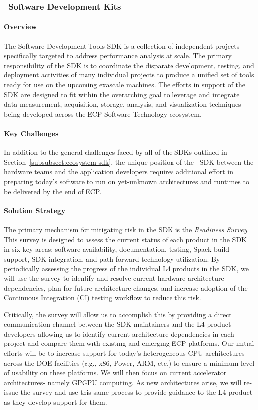 \subsubsection{ \tools\ Software Development Kits} 

\paragraph{Overview}
The Software Development Tools SDK is a collection of independent projects specifically targeted to address performance analysis at scale. The primary responsibility of the SDK is to coordinate the disparate development, testing, and deployment activities of many individual projects to produce a unified set of tools ready for use on the upcoming exascale machines. The efforts in support of the SDK are designed to fit within the overarching goal to leverage and integrate data measurement, acquisition, storage, analysis, and visualization techniques being developed across the ECP Software Technology ecosystem.


\paragraph{Key Challenges}
In addition to the general challenges faced by all of the SDKs outlined in Section~\ref{subsubsect:ecosystem-sdk}, the unique position of the \tools\ SDK between the hardware teams and the application developers requires additional effort in preparing today’s software to run on yet-unknown architectures and runtimes to be delivered by the end of ECP.

\paragraph{Solution Strategy}
The primary mechanism for mitigating risk in the SDK is the \textit{Readiness Survey}. This survey is designed to assess the current status of each product in the SDK in six key areas: software availability, documentation, testing, Spack build support, SDK integration, and path forward technology utilization. By periodically assessing the progress of the individual L4 products in the SDK, we will use the survey to identify and resolve current hardware architecture dependencies, plan for future architecture changes, and increase adoption of the Continuous Integration (CI) testing workflow to reduce this risk.

Critically, the survey will allow us to accomplish this by providing a direct communication channel between the SDK maintainers and the L4 product developers allowing us to identify current architecture dependencies in each project and compare them with existing and emerging ECP platforms. Our initial efforts will be to increase support for today’s heterogeneous CPU architectures across the DOE facilities (e.g., x86, Power, ARM, etc.) to ensure a minimum level of usability on these platforms. We will then focus on current accelerator architectures- namely GPGPU computing. As new architectures arise, we will re-issue the survey and use this same process to provide guidance to the L4 product as they develop support for them.

